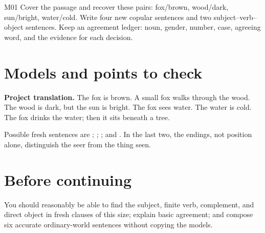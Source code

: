 \begin{courseunit}{M01}
Cover the passage and recover these pairs: fox/brown, wood/dark, sun/bright,
water/cold.  Write four new copular sentences and two subject--verb--object
sentences.  Keep an agreement ledger: noun, gender, number, case, agreeing
word, and the evidence for each decision.

\ifsolutions
\section{Models and points to check}

\textbf{Project translation.} The fox is brown. A small fox walks through the
wood. The wood is dark, but the sun is bright. The fox sees water. The water is
cold. The fox drinks the water; then it sits beneath a tree.

Possible fresh sentences are ; ;
; and .  In the last two,
the endings, not position alone, distinguish the seer from the thing seen.
\else
\section{Before continuing}

You should reasonably be able to find the subject, finite verb, complement,
and direct object in fresh clauses of this size; explain basic agreement; and
compose six accurate ordinary-world sentences without copying the models.
\fi
\end{courseunit}

